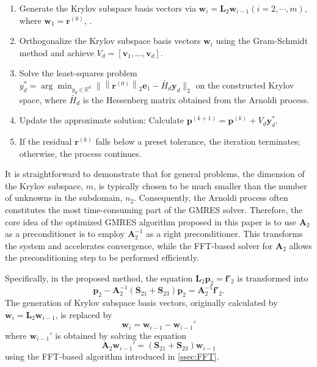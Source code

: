 \documentclass[preprint]{elsarticle}
\begin{document}
\begin{enumerate}
    \item Generate the Krylov subspace basis vectors via $\boldsymbol{w}_{i}=\boldsymbol{L}_{2}\boldsymbol{w}_{i-1}\left(i=2,\cdots,m\right)$, where $\boldsymbol{w}_{1}=\boldsymbol{r}^{\left(0\right)}$, .
    \item Orthogonalize the Krylov subspace basis vectors $\boldsymbol{w}_{i}$ using the Gram-Schmidt method and achieve $V_d = [\boldsymbol{v}_1, \dots, \boldsymbol{v}_d]$.
    \item Solve the least-squares problem $y_d^* = \arg \min_{y_d \in \mathbb{R}^d} \|\left\|\boldsymbol{r}^{\left(0\right)}\right\|_2 \boldsymbol{e}_1 - \bar{H}_d \boldsymbol{y}_d\|_2$  on the constructed Krylov space, where $\bar{H}_d$ is the Hessenberg matrix obtained from the Arnoldi process.
    \item Update the approximate solution: Calculate $\boldsymbol{p}^{\left(k+1\right)} = \boldsymbol{p}^{\left(k\right)} + V_d \boldsymbol{y}_d^*$.
    \item If the residual $\boldsymbol{r}^{\left(k\right)}$ falls below a preset tolerance, the iteration terminates; otherwise, the process continues.
\end{enumerate}

It is straightforward to demonstrate that for general problems, the dimension of the Krylov subspace, $m$, is typically chosen to be much smaller than the number of unknowns in the subdomain, $n_2$. Consequently, the Arnoldi process often constitutes the most time-consuming part of the GMRES solver. Therefore, the core idea of the optimized GMRES algorithm proposed in this paper is to use $\boldsymbol{A}_{2}$ as a preconditioner is to employ $\boldsymbol{A}_{2}^{-1}$ as a right preconditioner. This transforms the system and accelerates convergence, while the FFT-based solver for $\boldsymbol{A}_2$ allows the preconditioning step to be performed efficiently.\par
Specifically, in the proposed method, the equation $\boldsymbol{L}_{2}\boldsymbol{p}_{2}=\boldsymbol{f}'_{2}$ is transformed into
\begin{equation}
    \label{eq:precond_iter}
    \boldsymbol{p}_{2}-\boldsymbol{A}_{2}^{-1}\left(\boldsymbol{S}_{21}+\boldsymbol{S}_{23}\right)\boldsymbol{p}_{2}=\boldsymbol{A}_{2}^{-1}\boldsymbol{f}'_{2}.
\end{equation}
The generation of Krylov subspace basis vectors, originally calculated by $\boldsymbol{w}_{i}=\boldsymbol{L}_{2}\boldsymbol{w}_{i-1}$, is replaced by
\begin{equation}
    \label{eq:precond_basis}
    \boldsymbol{w}_{i}=\boldsymbol{w}_{i-1}-\boldsymbol{w}_{i-1}'
\end{equation}
where $\boldsymbol{w}_{i-1}'$ is obtained by solving the equation
\begin{equation}
    \label{eq:precond_basis_equ}
    \boldsymbol{A}_{2}\boldsymbol{w}_{i-1}'=\left(\boldsymbol{S}_{21}+\boldsymbol{S}_{23}\right)\boldsymbol{w}_{i-1}
\end{equation}
using the FFT-based algorithm introduced in \ref{ssec:FFT}.
\end{document}
